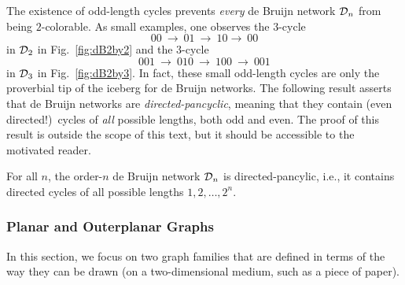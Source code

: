 The existence of odd-length cycles prevents {\em every} de Bruijn
network $\mbox{$\cal D$}_n$ from being $2$-colorable.  As small examples, one
observes the $3$-cycle
\[ 00 \ \rightarrow \ 01 \ \rightarrow \ 10  \rightarrow \ 00 \]
in $\mbox{$\cal D$}_2$ in Fig.~\ref{fig:dB2by2} and the $3$-cycle
\[ 001 \ \rightarrow \ 010 \ \rightarrow \ 100 \ \rightarrow \ 001 \]
in $\mbox{$\cal D$}_3$ in Fig.~\ref{fig:dB2by3}.  In fact, these small odd-length
cycles are only the proverbial tip of the iceberg for de Bruijn
networks.  The following result asserts that de Bruijn networks are
{\it directed-pancyclic},  
 
meaning that they contain (even directed!)~cycles of {\em all}
possible lengths, both odd and even.  The proof of this result is
outside the scope of this text, but it should be accessible to the
motivated reader.

\begin{prop}{\cite{Yoeli62}}
For all $n$, the order-$n$ de Bruijn
network $\mbox{$\cal D$}_n$ is directed-pancylic, i.e., it
contains directed cycles of all possible lengths $1, 2, \ldots, 2^n$.
\end{prop}

\subsubsection{Planar and Outerplanar Graphs}
\label{sec:planar+outerplanar-color}

In this section, we focus on two graph families that are defined in
terms of the way they can be drawn (on a two-dimensional medium, such
as a piece of paper).
\bigskip

\noindent {}
\bigskip

